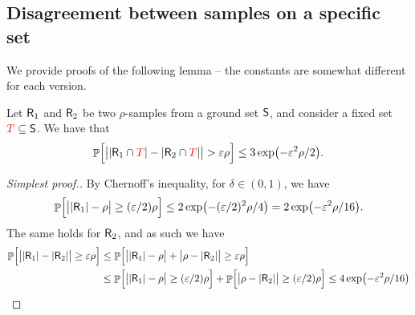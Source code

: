 \subsection{Disagreement between samples on a specific set}


We provide  proofs of the following lemma -- the constants are
somewhat different for each version.
\begin{lemma}
    Let $\mathsf{R}_1$ and $\mathsf{R}_2$ be two $\rho$-samples from a
    ground set $\mathsf{S}$, and consider a fixed set ${\textcolor{red}{T}} \subseteq
    \mathsf{S}$. We have that 
    \begin{equation*}
        \Prob{\Bigl.
           \cardin{\bigl.\cardin{\Sample_1 \cap \SetB} - \cardin{\Sample_2
                 \cap \SetB} }%
           > %
           \eps \rho
        }%
        \leq %
        3 \exp\pth{ -   \eps^2 \rho/2 }.
    \end{equation*}
\end{lemma}

\begin{proof}[Simplest proof.]
    By Chernoff's inequality, for $\delta \in (0,1)$, we have
    \begin{equation*}
        \Prob{ \Bigl.\cardin{\bigl.\cardin{\Sample_1} - \rho}
           \geq (\eps/2) \rho } %
        \leq %
        2 \exp\pth{ - (\eps/2)^2 \rho /4 }
        = %
        2 \exp\pth{ - \eps^2 \rho /16 }.
    \end{equation*}
    The same holds for $\mathsf{R}_2$, and as such we have
    \begin{align*}
      \Prob{ \Bigl.\cardin{\bigl.\cardin{\Sample_1} - \cardin{\Sample_2}}
      \geq \eps \rho } %
      &\leq %
        \Prob{ \Bigl.\cardin{\bigl.\cardin{\Sample_1} -\rho }
        + \cardin{\bigl.\rho - \cardin{\Sample_2}}
        \geq \eps \rho } %
      \\&
      \leq
      \Prob{ \Bigl.\cardin{\bigl.\cardin{\Sample_1} -\rho }
      \geq (\eps/2)\rho}
      +
      \Prob{ \Bigl.
      \cardin{\bigl.\rho - \cardin{\Sample_2}}
      \geq (\eps/2) \rho } %
      \leq %
      4 \exp\pth{ - \eps^2 \rho /16 }
    \end{align*}       
\end{proof}

